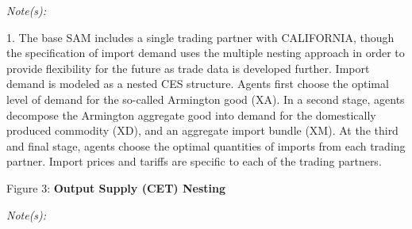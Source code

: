 \documentclass[12pt]{article}
\begin{document}
\textit{Note(s):}

\begin{footnotesize}
1. \hspace{10pt} The base SAM includes a single trading partner with CALIFORNIA, though the specification of import demand uses the multiple nesting approach in order to provide flexibility for the future as trade data is developed further. Import demand is modeled as a nested CES structure. Agents first choose the optimal level of demand for the so-called Armington good (XA). In a second stage, agents decompose the Armington aggregate good into demand for the domestically produced commodity (XD), and an aggregate import bundle (XM). At the third and final stage, agents choose the optimal quantities of imports from each trading partner. Import prices and tariffs are specific to each of the trading partners.

\end{footnotesize}


\begin{center}

Figure 3: \textbf{Output Supply (CET) Nesting}

\vspace{20pt}
\begin{scriptsize}
\end{scriptsize}
\end{center}

\textit{Note(s):}
\end{document}
